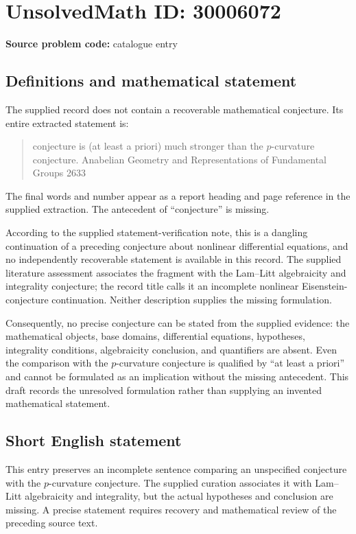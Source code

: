 \documentclass[11pt]{article}
\begin{document}
\section*{UnsolvedMath ID: 30006072}
\textbf{Source problem code:} catalogue entry
\subsection{Definitions and mathematical statement}
The supplied record does not contain a recoverable mathematical conjecture. Its entire extracted statement is:
\begin{quote}
conjecture is (at least a priori) much stronger than the \(p\)-curvature conjecture. Anabelian Geometry and Representations of Fundamental Groups 2633
\end{quote}
The final words and number appear as a report heading and page reference in the supplied extraction. The antecedent of ``conjecture'' is missing.

According to the supplied statement-verification note, this is a dangling continuation of a preceding conjecture about nonlinear differential equations, and no independently recoverable statement is available in this record. The supplied literature assessment associates the fragment with the Lam--Litt algebraicity and integrality conjecture; the record title calls it an incomplete nonlinear Eisenstein-conjecture continuation. Neither description supplies the missing formulation.

Consequently, no precise conjecture can be stated from the supplied evidence: the mathematical objects, base domains, differential equations, hypotheses, integrality conditions, algebraicity conclusion, and quantifiers are absent. Even the comparison with the \(p\)-curvature conjecture is qualified by ``at least a priori'' and cannot be formulated as an implication without the missing antecedent. This draft records the unresolved formulation rather than supplying an invented mathematical statement.
\subsection{Short English statement}
This entry preserves an incomplete sentence comparing an unspecified conjecture with the \(p\)-curvature conjecture. The supplied curation associates it with Lam--Litt algebraicity and integrality, but the actual hypotheses and conclusion are missing. A precise statement requires recovery and mathematical review of the preceding source text.
\end{document}

